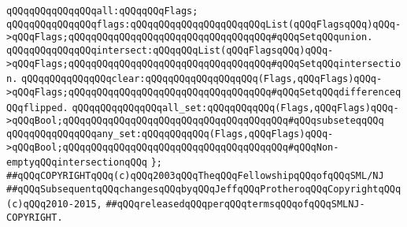 \verb|qQQqqQQqqQQqqQQqall:qQQqqQQqFlags;|\newline
\verb|qQQqqQQqqQQqqQQqflags:qQQqqQQqqQQqqQQqqQQqqQQqList(qQQqFlagsqQQq)qQQq->qQQqFlags;qQQqqQQqqQQqqQQqqQQqqQQqqQQqqQQqqQQq#qQQqSetqQQqunion.|\newline
\verb|qQQqqQQqqQQqqQQqintersect:qQQqqQQqList(qQQqFlagsqQQq)qQQq->qQQqFlags;qQQqqQQqqQQqqQQqqQQqqQQqqQQqqQQqqQQq#qQQqSetqQQqintersection.|\newline
\verb|qQQqqQQqqQQqqQQqclear:qQQqqQQqqQQqqQQqqQQq(Flags,qQQqFlags)qQQq->qQQqFlags;qQQqqQQqqQQqqQQqqQQqqQQqqQQqqQQqqQQq#qQQqSetqQQqdifferenceqQQqflipped.|\newline
\verb|qQQqqQQqqQQqqQQqall_set:qQQqqQQqqQQq(Flags,qQQqFlags)qQQq->qQQqBool;qQQqqQQqqQQqqQQqqQQqqQQqqQQqqQQqqQQqqQQq#qQQqsubseteqqQQq|\newline
\verb|qQQqqQQqqQQqqQQqany_set:qQQqqQQqqQQq(Flags,qQQqFlags)qQQq->qQQqBool;qQQqqQQqqQQqqQQqqQQqqQQqqQQqqQQqqQQqqQQq#qQQqNon-emptyqQQqintersectionqQQq|\newline
\verb|};|\newline
\newline
\newline
\verb|##qQQqCOPYRIGHTqQQq(c)qQQq2003qQQqTheqQQqFellowshipqQQqofqQQqSML/NJ|\newline
\verb|##qQQqSubsequentqQQqchangesqQQqbyqQQqJeffqQQqProtheroqQQqCopyrightqQQq(c)qQQq2010-2015,|\newline
\verb|##qQQqreleasedqQQqperqQQqtermsqQQqofqQQqSMLNJ-COPYRIGHT.|\newline

